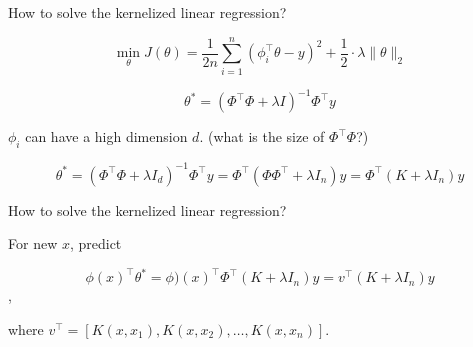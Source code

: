 \begin{frame}{How to solve the kernelized linear regression?}
	\begin{definitionbox}
	\[  \min_{\theta} J(\theta) = \frac{1}{2n}\sum_{i=1}^n (\phi_i^{\top}\theta - y)^2 + \frac{1}{2} \cdot \lambda \|\theta\|_2  \]
\end{definitionbox}
	\pause
		\begin{definitionbox}
	\[ \theta^* =  (  \Phi^{\top}\Phi + \lambda I  )^{-1} \Phi^{\top} y \]
\end{definitionbox}
	
	\pause
	\vspace{0.1cm}
	$\phi_i$ can have a high dimension $d$. (what is the size of $\Phi^{\top}\Phi$?)
	
	\pause
	\begin{definitionbox}
	\[	\theta^* =  (  \Phi^{\top}\Phi + \lambda I_d )^{-1} \Phi^{\top} y  = \Phi^{\top} (\Phi \Phi^{\top} + \lambda I_n)y = \Phi^{\top} (K+ \lambda I_n)y    \]
	\end{definitionbox}
	

	
\end{frame}
\begin{frame}{How to solve the kernelized linear regression?}

	For new $x$, predict 
\begin{definitionbox}
	\[	\phi(x)^{\top}\theta^*  =\phi)(x)^{\top} \Phi^{\top} (K+ \lambda I_n)y  = v^{\top} (K+ \lambda I_n)y  \],
\end{definitionbox}
where $v^{\top} = [K(x,x_1), K(x,x_2),\ldots, K(x,x_n)  ].$

\end{frame}

